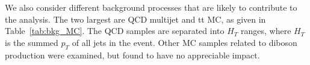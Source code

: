 \begin{table}[htb]
\begin{center}
\begin{tabular}{|l|c|c}
      \hline
    \end{tabular}
  \end{center}
\end{table}

We also consider different background processes that are likely to contribute to the analysis. The two largest are QCD multijet and tt MC, as given in Table~\ref{tab:bkg_MC}. The QCD samples are separated into $H_{T}$ ranges, where $H_{T}$ is the summed $p_{T}$ of all jets in the event. Other MC samples related to diboson production were examined, but found to have no appreciable impact.

